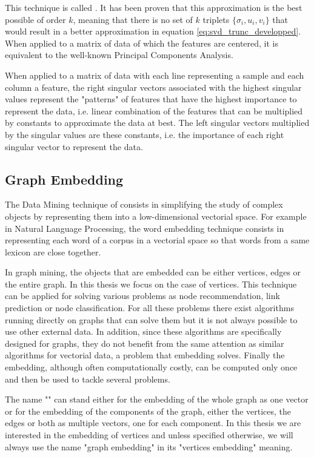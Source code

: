 This technique is called . It has been proven that this approximation is the best possible of order $k$, meaning that there is no set of $k$ triplets $\{\sigma_i, u_i, v_i\}$ that would result in a better approximation in equation \ref{eq:svd_trunc_developped}. When applied to a matrix of data of which the features are centered, it is equivalent to the well-known Principal Components Analysis.

When applied to a matrix of data with each line representing a sample and each column a feature, the right singular vectors associated with the highest singular values represent the "patterns" of features that have the highest importance to represent the data, i.e. linear combination of the features that can be multiplied by constants to approximate the data at best. The left singular vectors multiplied by the singular values are these constants, i.e. the importance of each right singular vector to represent the data.

\subsection{Graph Embedding}\label{subsec:intro_graph_embedding}
The Data Mining technique of  consists in simplifying the study of complex objects by representing them into a low-dimensional vectorial space. For example in Natural Language Processing, the word embedding technique consists in representing each word of a corpus in a vectorial space so that words from a same lexicon are close together.

In graph mining, the objects that are embedded can be either vertices, edges or the entire graph. In this thesis we focus on the case of vertices. This technique can be applied for solving various problems as node recommendation, link prediction or node classification. For all these problems there exist algorithms running directly on graphs that can solve them but it is not always possible to use other external data. In addition, since these algorithms are specifically designed for graphs, they do not benefit from the same attention as similar algorithms for vectorial data, a problem that embedding solves. Finally the embedding, although often computationally costly, can be computed only once and then be used to tackle several problems. 

The name "" can stand either for the embedding of the whole graph as one vector or for the embedding of the components of the graph, either the vertices, the edges or both as multiple vectors, one for each component. In this thesis we are interested in the embedding of vertices and unless specified otherwise, we will always use the name "graph embedding" in its "vertices embedding" meaning.

